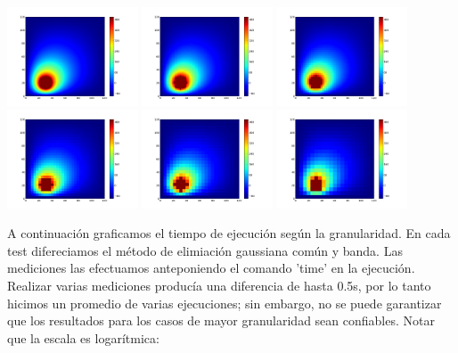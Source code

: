 \documentclass[spanish,a4paper]{article}
\begin{document}
\includegraphics[width=110pt]{Parabrisas4-1.png} \includegraphics[width=110pt]{Parabrisas4-2.png} \includegraphics[width=110pt]{Parabrisas4-3.png} \newline \includegraphics[width=110pt]{Parabrisas4-4.png} \includegraphics[width=110pt]{Parabrisas4-5.png} \includegraphics[width=110pt]{Parabrisas4-6.png} \newline

A continuación graficamos el tiempo de ejecución según la granularidad. En cada test difereciamos el método de elimiación gaussiana común y banda. Las mediciones las efectuamos anteponiendo el comando 'time' en la ejecución. Realizar varias mediciones producía una diferencia de hasta 0.5s, por lo tanto hicimos un promedio de varias ejecuciones; sin embargo, no se puede garantizar que los resultados para los casos de mayor granularidad sean confiables. Notar que la escala es logarítmica:
\end{document}
